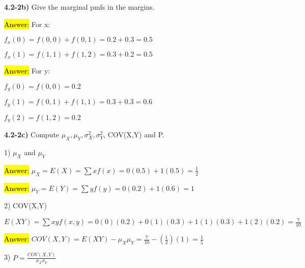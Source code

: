 \documentclass{article}
\begin{document}
\textbf{ 4.2-2b)} Give the marginal pmfs in the margins.

\vspace{2mm}

\hl{Answer:} For x:

$f_{x}(0)=f(0,0)+f(0,1)=0.2+0.3=0.5$

\vspace{2mm}

$f_{x}(1)=f(1,1)+f(1,2)=0.3+0.2=0.5$

\vspace{4mm}

\hl{Answer:} For y:

\vspace{2mm}

$f_{y}(0)=f(0,0)=0.2$

\vspace{2mm}

$f_{y}(1)=f(0,1)+f(1,1)=0.3+0.3=0.6$

\vspace{2mm}

$f_{y}(2)=f(1,2)=0.2$


\vspace{5mm}


\textbf{ 4.2-2c)} Compute $\mu_{X}, \mu_{Y}, \sigma^{2}_{X},  \sigma^{2}_{Y}$, COV(X,Y) and P.

\vspace{2mm}

1)  $\mu_{X}$ and $\mu_{Y}$

\vspace{2mm}

\hl{Answer:}  $\mu_{X}=E(X)=\sum x f(x)=0(0.5)+1(0.5)=\frac{1}{2}$

\vspace{2mm}

\hl{Answer:}  $\mu_{Y}=E(Y)=\sum y f(y)=0(0.2)+1(0.6)=1$

\vspace{4mm}

2) COV(X,Y)

\vspace{2mm}

$E(XY)= \sum xy f(x,y)=0(0)(0.2)+0(1)(0.3)+1(1)(0.3)+1(2)(0.2)=\frac{7}{10}$

\hl{Answer:}  $COV(X,Y)=E(XY)-\mu_{X}\mu_{Y}=\frac{7}{10}-(\frac{1}{2})(1)=\frac{1}{5}$


\vspace{4mm}

3) $P=\frac{COV(X,Y)}{\sigma_{X}\sigma_{Y}}$
\end{document}
